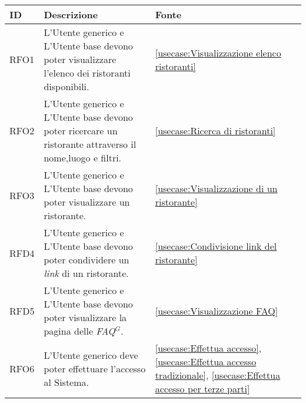 \begin{table}[H]
	\renewcommand{\arraystretch}{1.5}
	\centering
	\begin{tabularx}{\textwidth}{l|X|p{2cm}}
		\textbf{ID} & \textbf{Descrizione}                                                                                       & \textbf{Fonte}                                                                                                                                               \\
		\hline
		RFO1        & L'Utente generico e L'Utente base devono poter visualizzare l'elenco dei ristoranti disponibili.                             & \autoref{usecase:Visualizzazione elenco ristoranti}                                                                                                          \\
		\hline
		RFO2        & L'Utente generico e L'Utente base devono poter ricercare un ristorante attraverso il nome,luogo e filtri.                    & \autoref{usecase:Ricerca di ristoranti}                                                                                                                      \\
		\hline
		RFO3        & L'Utente generico e L'Utente base devono poter visualizzare un ristorante.                                                   & \autoref{usecase:Visualizzazione di un ristorante}                                                                                                           \\
		\hline
		RFD4        & L'Utente generico e L'Utente base devono poter condividere un \textit{link} di un ristorante.                                         & \autoref{usecase:Condivisione link del ristorante}                                                                                                           \\
		\hline
		RFD5        & L'Utente generico e L'Utente base devono poter visualizzare la pagina delle  \textit{\ac{FAQ}$^G$}.                                             & \autoref{usecase:Visualizzazione FAQ}                                                                                                                        \\
		\hline
		RFO6        & L'Utente generico deve poter effettuare l'accesso al Sistema.                                              & \autoref{usecase:Effettua accesso}, \autoref{usecase:Effettua accesso tradizionale}, \autoref{usecase:Effettua accesso per terze parti}                      \\

\end{tabularx}
\end{table}
